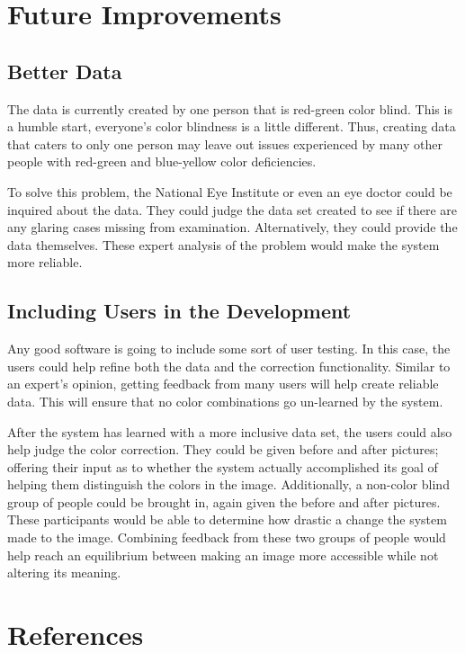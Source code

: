 \documentclass[12pt]{article}
\begin{document}
\begin{multicols}{2}
\section{Future Improvements}
\subsection{Better Data}
The data is currently created by one person that is red-green color blind. This is a humble start, everyone's color blindness is a little different. Thus, creating data that caters to only one person may leave out issues experienced by many other people with red-green and blue-yellow color deficiencies.

To solve this problem, the National Eye Institute or even an eye doctor could be inquired about the data. They could judge the data set created to see if there are any glaring cases missing from examination. Alternatively, they could provide the data themselves. These expert analysis of the problem would make the system more reliable.

\subsection{Including Users in the Development}
Any good software is going to include some sort of user testing. In this case, the users could help refine both the data and the correction functionality. Similar to an expert's opinion, getting feedback from many users will help create reliable data. This will ensure that no color combinations go un-learned by the system. 

After the system has learned with a more inclusive data set, the users could also help judge the color correction. They could be given before and after pictures; offering their input as to whether the system actually accomplished its goal of helping them distinguish the colors in the image. Additionally, a non-color blind group of people could be brought in, again given the before and after pictures. These participants would be able to determine how drastic a change the system made to the image. Combining feedback from these two groups of people would help reach an equilibrium between making an image more accessible while not altering its meaning.


\section{References}
{}

\end{multicols}
\end{document}
